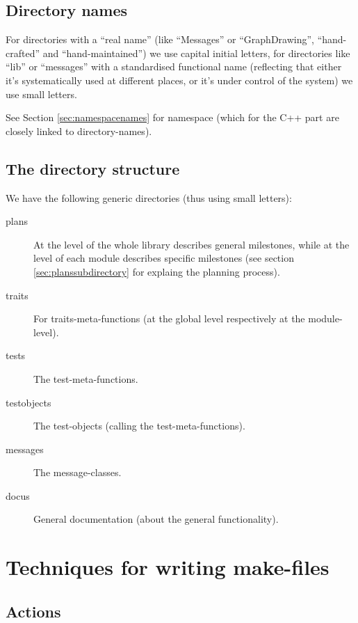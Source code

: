 \documentclass{book}
\begin{document}
\subsection{Directory names}
\label{sec:Directorynames}

For directories with a ``real name'' (like ``Messages'' or ``GraphDrawing'', ``hand-crafted'' and ``hand-maintained'') we use capital initial letters, for directories like ``lib'' or ``messages'' with a standardised functional name (reflecting that either it's systematically used at different places, or it's under control of the system) we use small letters.

See Section \ref{sec:namespacenames} for namespace (which for the C++ part are closely linked to directory-names).


\subsection{The directory structure}
\label{sec:directorystructure}

We have the following generic directories (thus using small letters):
\begin{description}
\item[plans] At the level of the whole library describes general milestones, while at the level of each module describes specific milestones (see section \ref{sec:planssubdirectory} for explaing the planning process).
\item[traits] For traits-meta-functions (at the global level respectively at the module-level).
\item[tests] The test-meta-functions.
\item[testobjects] The test-objects (calling the test-meta-functions).
\item[messages] The message-classes.
\item[docus] General documentation (about the general functionality).
\end{description}




\section{Techniques for writing make-files}
\label{sec:makeTechniques}

\subsection{Actions}
\label{sec:makeTechniquesActions}
\end{document}

